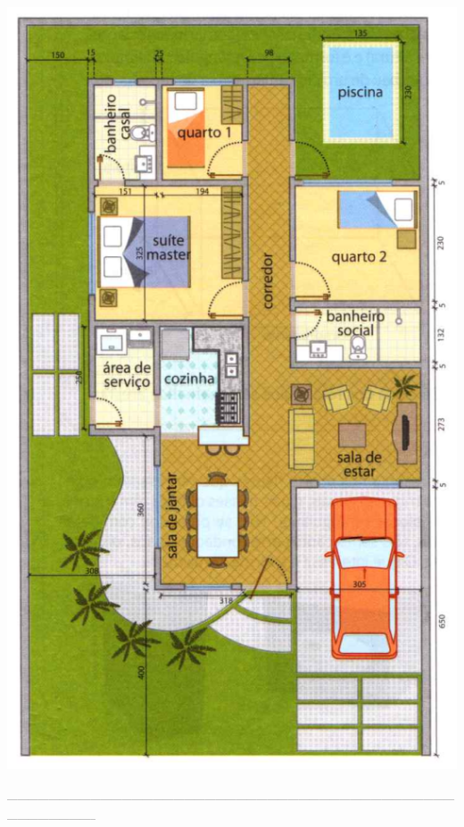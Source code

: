 \documentclass[a4paper,14pt]{article}
\begin{document}
\begin{multicols}{2}
		\includegraphics[width=1\linewidth]{6FMA30_imagens/imagem1}
		
	\end{multicols}
	\noindent\textsubscript{-----------------------------------------------------------------------------------------------------------------------------------------------------------}
\end{document}
